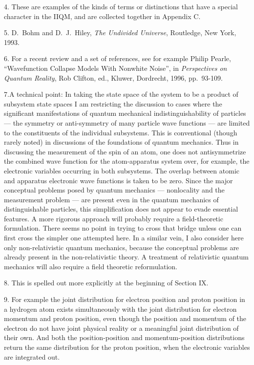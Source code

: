 4. These are examples of the kinds of terms or distinctions that have
a special character in the IIQM, and are collected together in
Appendix C.

5.  D.~Bohm and D.~J.~Hiley, {\it The Undivided
Universe}, Routledge, New York, 1993.

6. For a recent review and
a set of references, see for example Philip Pearle, ``Wavefunction
Collapse Models With Nonwhite Noise'', in {\it Perspectives on Quantum
Reality\/}, Rob Clifton, ed., Kluwer, Dordrecht, 1996, pp.~93-109.

7.A technical point: In
taking the state space of the system to be a product of subsystem
state spaces I am restricting the discussion to cases where the
significant manifestations of quantum mechanical indistinguishability
of particles --- the symmetry or anti-symmetry of many particle wave
functions --- are limited to the constituents of the individual
subsystems.  This is conventional (though rarely noted) in discussions
of the foundations of quantum mechanics.  Thus in discussing the
measurement of the spin of an atom, one does not antisymmetrize the
combined wave function for the atom-apparatus system over, for
example, the electronic variables occurring in both subsystems. The
overlap between atomic and apparatus electronic wave functions is
taken to be zero.  Since the major conceptual problems posed by
quantum mechanics --- nonlocality and the measurement problem --- are
present even in the quantum mechanics of distinguishable particles,
this simplification does not appear to evade essential features.  A
more rigorous approach will probably require a field-theoretic
formulation.  There seems no point in trying to cross that bridge
unless one can first cross the simpler one attempted here.  In a
similar vein, I also consider here only non-relativistic quantum
mechanics, because the conceptual problems are already present in the
non-relativistic theory.  A treatment of relativistic quantum
mechanics will also require a field theoretic reformulation.

8. This is spelled out more explicitly at the beginning of
Section IX.

9. For example the
joint distribution for electron position and proton position in a
hydrogen atom exists simultaneously with the joint distribution for
electron momentum and proton position, even though the position and
momentum of the electron do not have joint physical reality or a
meaningful joint distribution of their own.  And both the
position-position and momentum-position distributions return the same
distribution for the proton position, when the electronic variables
are integrated out.

